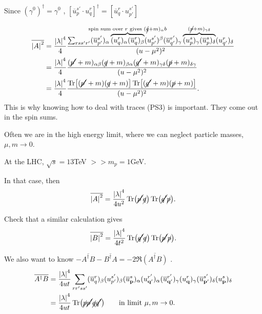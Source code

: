 \begin{remark}
  Since $(\gamma^0)^{\dagger} = \gamma^0$ , $[\overline{u}^{s'}_{p} \cdot u^{r}_{q}]^{\dagger} = [\overline{u}^{r}_{q} \cdot u^{s'}_{p'}]$ 
\end{remark}
\begin{align}
  \overline{\abs{A}^2} &= \frac{\abs{\lambda}^4}{4} \frac{\sum_{rss'r'} (\overline{u}{}^{s'}_{p'})_{\alpha} \overbrace{(u^{r}_{q})_{\alpha} (\overline{u}{}^{r}_{q})_{\beta}}^{\mathclap{\text{spin sum over $r$ gives } (\cancel{q} + m)_{\alpha}b}} (u^{s'}_{p'})^{\beta} (\overline{u}{}^{r'}_{q'})_{\gamma} \overbrace{(u^{s}_{p})_{\gamma} (\overline{u}{}^{s}_{p})_{\delta}}^{\mathclap{(\cancel{p} + m)_{\gamma\delta}}} (u^{r}_{q'})_{\delta} }{(u - \mu^2)^2} \\
  &= \frac{\abs{\lambda}^4}{4} \frac{(\cancel{p'} + m)_{\alpha\beta} (\cancel{q} + m)_{\beta\alpha} (\cancel{q'} + m)_{\gamma\delta} (\cancel{p} + m)_{\delta\gamma}}{(u - \mu^2)^2}  \\
  &= \frac{\abs{\lambda}^4}{4} \frac{\Tr[(\cancel{p'} + m)(\cancel{q} + m)] \Tr[(\cancel{q'} + m )(\cancel{p} + m)]}{(u - \mu^2)^2}.
\end{align}
This is why knowing how to deal with traces (PS3) is important. They come out in the spin sums.

Often we are in the high energy limit, where we can neglect particle masses, $\mu, m \to 0$.
 \begin{example}[]
  At the LHC, $\sqrt{s} = 13$TeV $>> m_p = 1$GeV.
\end{example}
In that case, then 
\begin{equation}
  \overline{\abs{A}^2} = \frac{\abs{\lambda}^4}{4 u^2} \Tr(\cancel{p'} \cancel{q}) \Tr(\cancel{q'} \cancel{p}).
\end{equation}
\begin{exercise}
  Check that a similar calculation gives
  \begin{equation}
    \overline{\abs{B}^2} = \frac{\abs{\lambda}^4}{4t^2} \Tr(\cancel{q'} \cancel{q}) \Tr(\cancel{p'} \cancel{p}).
  \end{equation}
\end{exercise}
We also want to know $- \overline{A^{\dagger} B} - \overline{B^{\dagger} A} = -2 \Re \overline{(A^{\dagger} B)}$ .
\begin{align}
  \overline{A^{\dagger} B} &= \frac{\abs{\lambda}^4}{4 ut} \sum_{r r' s s'} (\overline{u}^{r}_{q})_{\beta} (u^{s'}_{p'})_{\beta} (\overline{u}{}^{s}_{\vb{p}})_{\alpha}(u^{r'}_{\vb{q}'})_{\alpha} (\overline{u}{}^{r'}_{\vb{q}'})_{\gamma} (u^{r}_{\vb{q}})_{\gamma} (\overline{u}{}^{s'}_{\vb{p}'})_{\delta} (u^{s}_{\vb{p}})_{\delta} \\
			   &= \frac{\abs{\lambda}^4}{4ut} \Tr (\cancel{p} \cancel{p'} \cancel{q} \cancel{q'}) \qquad \text{in limit } \mu, m \to 0.
\end{align}

